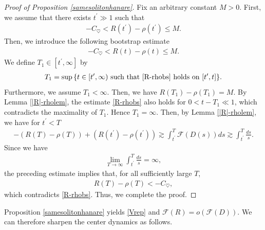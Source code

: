 \documentclass[reqno]{amsart}
\theoremstyle{plain}
\theoremstyle{definition}
\numberwithin{equation}{section}
\begin{document}
\begin{proof}[Proof of Proposition \ref{samesolitonhanare}]
Fix an arbitrary constant $M>0$. First, we assume that there exists $t^{\prime}\gg 1$ such that 
\begin{align*}
-C_{\heartsuit}<R(t^{\prime})-\rho(t^{\prime})\leq M.
\end{align*}
Then, we introduce the following bootstrap estimate
\begin{align}\label{R-rhobs}
-C_{\heartsuit}<R(t)-\rho(t)\leq M.
\end{align}
We define $T_1\in [t^{\prime},\infty]$ by
\begin{align}\label{rho-RnoT1}
T_1=\sup{ \{t\in[t^{\prime},\infty)\ \mbox{such that}\ \eqref{R-rhobs}\ \mbox{holds on}\ [t^{\prime},t] \} }.
\end{align}
Furthermore, we assume $T_1<\infty$. Then, we have $R(T_1)-\rho(T_1)=M$. By Lemma \ref{|R|-rholem}, the estimate \eqref{R-rhobs} also holds for $0<t-T_1\ll 1$, which contradicts the maximality of $T_1$. Hence $T_1=\infty$. Then, by Lemma \ref{|R|-rholem}, we have for $t^{\prime}<T$
\begin{align*}
-\left(R(T)-\rho(T)\right)+\left(R(t^{\prime})-\rho(t^{\prime})\right)\gtrsim\int_{t^{\prime}}^T\mathcal{F}(D(s))ds\gtrsim \int_{t^{\prime}}^T\frac{ds}{s}.
\end{align*}
Since we have
\begin{align*}
\lim_{T\to\infty}\int_{t^{\prime}}^T\frac{ds}{s}=\infty,
\end{align*}
the preceding estimate implies that, for all sufficiently large $T$,
\begin{align*}
R(T)-\rho(T)<-C_{\heartsuit},
\end{align*}
which contradicts \eqref{R-rhobs}. Thus, we complete the proof.
\end{proof}
Proposition \ref{samesolitonhanare} yields \eqref{Vrep} and
$\mathcal{F}(R)=o\left(\mathcal{F}(D)\right)$.
We can therefore sharpen the center dynamics as follows.
\end{document}
